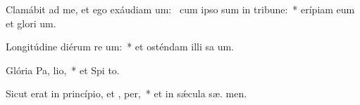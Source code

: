 \item Clamábit ad me, et ego exáudiam um:~\pscross{} cum ipso sum in tribune:~* erípiam eum et glori um.
\item Longitúdine diérum re um:~* et osténdam illi sa um.
\item Glória Pa,  lio,~* et Spi to.
\item Sicut erat in princípio, et ,  per,~* et in sǽcula sæ. men.
